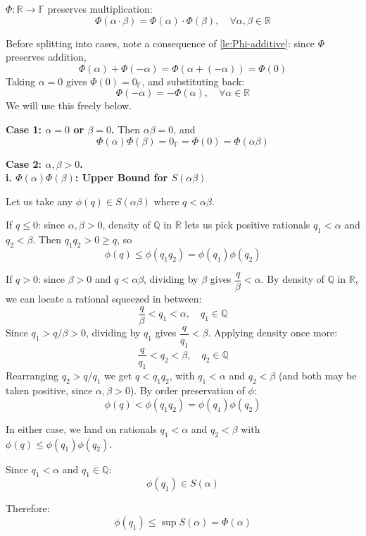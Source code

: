 \begin{lemma}\label{le:Phi-multiplicative}
$\Phi: \mathbb{R} \rightarrow \mathbb{F}$ preserves multiplication:
$$\Phi(\alpha \cdot \beta) = \Phi(\alpha) \cdot \Phi(\beta), \quad \forall \alpha, \beta \in \mathbb{R}$$
\end{lemma}

\begin{bookproof}
Before splitting into cases, note a consequence of \cref{le:Phi-additive}: since $\Phi$ preserves addition,
$$\Phi(\alpha)+\Phi(-\alpha) = \Phi(\alpha + (-\alpha)) = \Phi(0)$$
Taking $\alpha = 0$ gives $\Phi(0) = 0_\mathbb{F}$, and substituting back:
$$\Phi(-\alpha) = -\Phi(\alpha), \quad \forall \alpha \in \mathbb{R}$$
We will use this freely below.

\textbf{Case 1: $\alpha = 0$ or $\beta = 0$.} Then $\alpha\beta = 0$, and
$$\Phi(\alpha)\Phi(\beta) = 0_\mathbb{F} = \Phi(0) = \Phi(\alpha\beta)$$

\textbf{Case 2: $\alpha, \beta > 0$.}\\

\textbf{i. $\Phi(\alpha)\Phi(\beta)$: Upper Bound for $S(\alpha\beta)$}

Let us take any $\phi(q) \in S(\alpha\beta)$ where $q < \alpha\beta$.

If $q \leq 0$: since $\alpha, \beta > 0$, density of $\mathbb{Q}$ in $\mathbb{R}$ lets us pick positive rationals $q_1 < \alpha$ and $q_2 < \beta$. Then $q_1 q_2 > 0 \geq q$, so
$$\phi(q) \leq \phi(q_1 q_2) = \phi(q_1)\phi(q_2)$$

If $q > 0$: since $\beta > 0$ and $q < \alpha\beta$, dividing by $\beta$ gives $\dfrac{q}{\beta} < \alpha$. By density of $\mathbb{Q}$ in $\mathbb{R}$, we can locate a rational squeezed in between:
$$\frac{q}{\beta} < q_1 < \alpha, \quad q_1 \in \mathbb{Q}$$
Since $q_1 > q/\beta > 0$, dividing by $q_1$ gives $\dfrac{q}{q_1} < \beta$. Applying density once more:
$$\frac{q}{q_1} < q_2 < \beta, \quad q_2 \in \mathbb{Q}$$
Rearranging $q_2 > q/q_1$ we get $q < q_1 q_2$, with $q_1 < \alpha$ and $q_2 < \beta$ (and both may be taken positive, since $\alpha, \beta > 0$). By order preservation of $\phi$:
$$\phi(q) < \phi(q_1 q_2) = \phi(q_1)\phi(q_2)$$

In either case, we land on rationals $q_1 < \alpha$ and $q_2 < \beta$ with $\phi(q) \leq \phi(q_1)\phi(q_2)$.

Since $q_1 < \alpha$ and $q_1 \in \mathbb{Q}$:
$$\phi(q_1) \in S(\alpha)$$

Therefore:
$$\phi(q_1) \leq \sup S(\alpha) = \Phi(\alpha)$$


\end{bookproof}
